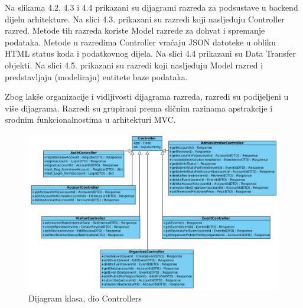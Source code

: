 			\textit{}

			Na slikama 4.2, 4.3 i 4.4 prikazani su dijagrami razreda za podsustave u backend dijelu arhitekture. Na slici 4.3. prikazani su razredi koji nasljeđuju Controller razred. Metode tih razreda koriste Model razrede za dohvat i spremanje podataka. Metode u razredima Controller vraćaju JSON datoteke u obliku HTML status koda i podatkovnog dijela. Na slici 4.4 prikazani su Data Transfer objekti. Na slici 4.5. prikazani su razredi koji nasljeđuju Model razred i predstavljaju (modeliraju) entitete baze podataka.
			
			Zbog lakše organizacije i vidljivosti dijagrama razreda, razredi su podijeljeni u više dijagrama. Razredi su grupirani prema sličnim razinama apstrakcije i srodnim funkcionalnostima u arhitekturi MVC.
			
			\begin{figure}[htbp]
				\centering
				\includegraphics[width=1\textwidth]{dijagrami/dijagram_mvc_controllers.png}
				\caption{Dijagram klasa, dio Controllers}
			\label{fig:my_image}
			\end{figure}

			\newpage

